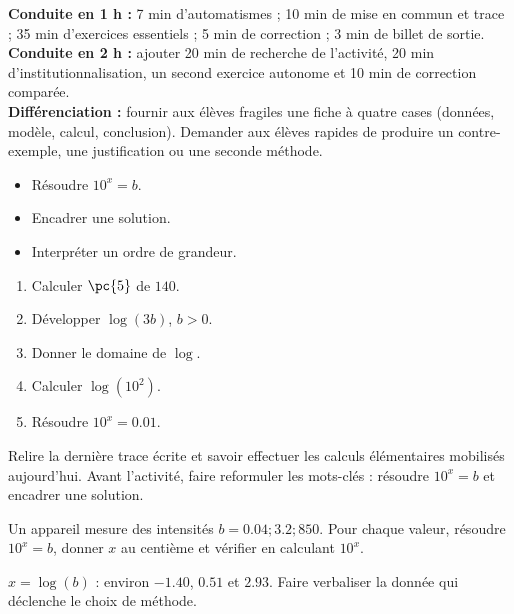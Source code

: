 \ifmxteacher
\begin{method}
\textbf{Conduite en 1 h :} 7 min d'automatismes ; 10 min de mise en commun et trace ; 35 min d'exercices essentiels ; 5 min de correction ; 3 min de billet de sortie.\\
\textbf{Conduite en 2 h :} ajouter 20 min de recherche de l'activité, 20 min d'institutionnalisation, un second exercice autonome et 10 min de correction comparée.\\
\textbf{Différenciation :} fournir aux élèves fragiles une fiche à quatre cases (données, modèle, calcul, conclusion). Demander aux élèves rapides de produire un contre-exemple, une justification ou une seconde méthode.
\end{method}
\fi
{}
\begin{objectives}\begin{itemize}\item Résoudre $10^x=b$.\item Encadrer une solution.\item Interpréter un ordre de grandeur.\end{itemize}\end{objectives}
\begin{fluency}\begin{enumerate}\item Calculer $\pc{5}$ de $140$. \item Développer $\log(3b)$, $b>0$. \item Donner le domaine de $\log$. \mxblank{$]0,+\infty[$}\item Calculer $\log(10^2)$. \item Résoudre $10^x=\num{0,01}$. \end{enumerate}\end{fluency}
\begin{prerequisites}Relire la dernière trace écrite et savoir effectuer les calculs élémentaires mobilisés aujourd'hui. Avant l'activité, faire reformuler les mots-clés : résoudre $10^x=b$ et encadrer une solution.\end{prerequisites}

\begin{activity}
Un appareil mesure des intensités $b=\num{0,04};\num{3,2};850$. Pour chaque valeur, résoudre $10^x=b$, donner $x$ au centième et vérifier en calculant $10^x$.

\end{activity}
\begin{solution}$x=\log(b)$ : environ $-\num{1,40}$, $\num{0,51}$ et $\num{2,93}$. Faire verbaliser la donnée qui déclenche le choix de méthode.\end{solution}

